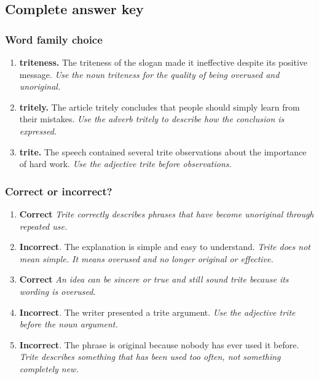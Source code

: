 \documentclass[11pt]{article}
\begin{document}
\subsection{Complete answer key}
\subsubsection{Word family choice}
\begin{enumerate}
  \item \textbf{triteness.} The triteness of the slogan made it ineffective despite its positive message. \emph{Use the noun triteness for the quality of being overused and unoriginal.}
  \item \textbf{tritely.} The article tritely concludes that people should simply learn from their mistakes. \emph{Use the adverb tritely to describe how the conclusion is expressed.}
  \item \textbf{trite.} The speech contained several trite observations about the importance of hard work. \emph{Use the adjective trite before observations.}
\end{enumerate}

\subsubsection{Correct or incorrect?}
\begin{enumerate}
  \item \textbf{Correct} \emph{Trite correctly describes phrases that have become unoriginal through repeated use.}
  \item \textbf{Incorrect}. The explanation is simple and easy to understand. \emph{Trite does not mean simple. It means overused and no longer original or effective.}
  \item \textbf{Correct} \emph{An idea can be sincere or true and still sound trite because its wording is overused.}
  \item \textbf{Incorrect}. The writer presented a trite argument. \emph{Use the adjective trite before the noun argument.}
  \item \textbf{Incorrect}. The phrase is original because nobody has ever used it before. \emph{Trite describes something that has been used too often, not something completely new.}
\end{enumerate}
\end{document}
